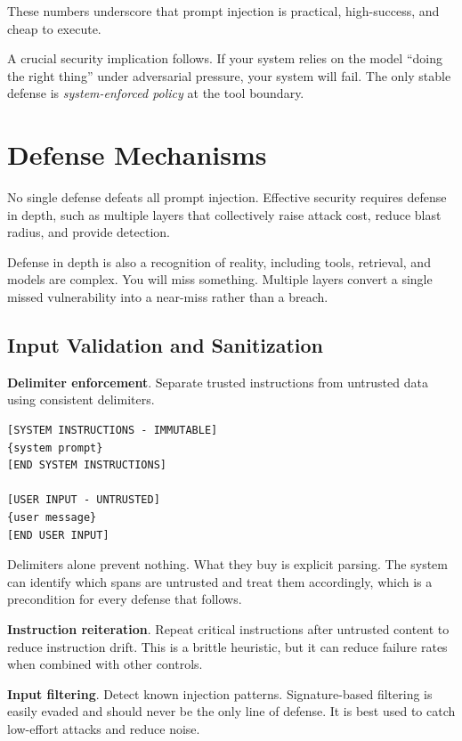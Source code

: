 These numbers underscore that prompt injection is practical, high-success, and cheap to execute.

A crucial security implication follows. If your system relies on the model ``doing the right thing'' under adversarial pressure, your system will fail. The only stable defense is \emph{system-enforced policy} at the tool boundary.

\section{Defense Mechanisms}

No single defense defeats all prompt injection. Effective security requires defense in depth, such as multiple layers that collectively raise attack cost, reduce blast radius, and provide detection.

Defense in depth is also a recognition of reality, including tools, retrieval, and models are complex. You will miss something. Multiple layers convert a single missed vulnerability into a near-miss rather than a breach.

\subsection{Input Validation and Sanitization}

\textbf{Delimiter enforcement}. Separate trusted instructions from untrusted data using consistent delimiters.

\begin{verbatim}
[SYSTEM INSTRUCTIONS - IMMUTABLE]
{system prompt}
[END SYSTEM INSTRUCTIONS]

[USER INPUT - UNTRUSTED]
{user message}
[END USER INPUT]
\end{verbatim}

Delimiters alone prevent nothing. What they buy is explicit parsing. The system can identify which spans are untrusted and treat them accordingly, which is a precondition for every defense that follows.

\textbf{Instruction reiteration}. Repeat critical instructions after untrusted content to reduce instruction drift. This is a brittle heuristic, but it can reduce failure rates when combined with other controls.

\textbf{Input filtering}. Detect known injection patterns. Signature-based filtering is easily evaded and should never be the only line of defense. It is best used to catch low-effort attacks and reduce noise.

